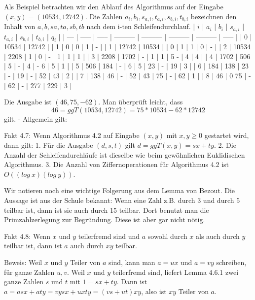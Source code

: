 \documentclass[a4paper]{article}
\begin{document}
\begin{multicols}{3}
    Als Beispiel betrachten wir den Ablauf des Algorithmus auf der Eingabe $(x,y) =(10534,12742)$. Die Zahlen $a_i,b_i,s_{a,i},t_{a,i},s_{b,i},t_{b,i}$ bezeichnen den Inhalt von $a,b,sa,ta,sb,tb$ nach dem i-ten Schleifendurchlauf.
    | $i$ | $a_i$ | $b_i$ | $s_{a,i}$ | $t_{a,i}$ | $s_{b,i}$ | $t_{b,i}$ | $q_i$ |
    | --- | ----- | ----- | --------- | --------- | --------- | --------- | ----- |
    | 0   | 10534 | 12742 |           | 1         | 0         | 0         | 1     | -  |
    | 1   | 12742 | 10534 |           | 0         | 1         | 1         | 0     | -  |
    | 2   | 10534 | 2208  | 1         | 0         | -         | 1         | 1     | 1  |
    | 3   | 2208  | 1702  | -         | 1         | 1         | 5 -       | 4     | 4  |
    | 4   | 1702  | 506   | 5         | -         | 4         | - 6       | 5     | 1  |
    | 5   | 506   | 184   | -         | 6         | 5         | 23        | -     | 19 | 3 |
    | 6   | 184   | 138   | 23        | -         | 19        | -         | 52    | 43 | 2 |
    | 7   | 138   | 46    | -         | 52        | 43        | 75        | -     | 62 | 1 |
    | 8   | 46    | 0 75  | -         | 62        | -         | 277       | 229   | 3  |

    Die Ausgabe ist $(46, 75 ,-62)$. Man überprüft leicht, dass
    $$46 = ggT(10534,12742) = 75* 10534 - 62 * 12742$$
    gilt. - Allgemein gilt:

    Fakt 4.7: Wenn Algorithmus 4.2 auf Eingabe $(x,y)$ mit $x,y\geq 0$ gestartet wird, dann gilt:
    1. Für die Ausgabe $(d,s,t)$ gilt $d= ggT(x,y) =sx+ty$.
    2. Die Anzahl der Schleifendurchläufe ist dieselbe wie beim gewöhnlichen Euklidischen Algorithmus.
    3. Die Anzahl von Ziffernoperationen für Algorithmus 4.2 ist $O((log\ x)(log\ y))$.

    Wir notieren noch eine wichtige Folgerung aus dem Lemma von Bezout. Die Aussage ist aus der Schule bekannt: Wenn eine Zahl z.B. durch $3$ und durch $5$ teilbar ist, dann ist sie auch durch 15 teilbar. Dort benutzt man die Primzahlzerlegung zur Begründung. Diese ist aber gar nicht nötig.

    Fakt 4.8: Wenn $x$ und $y$ teilerfremd sind und $a$ sowohl durch $x$ als auch durch $y$ teilbar ist, dann ist $a$ auch durch $xy$ teilbar.

    Beweis: Weil $x$ und $y$ Teiler von $a$ sind, kann man $a=ux$ und $a=vy$ schreiben, für ganze Zahlen $u,v$. Weil $x$ und $y$ teilerfremd sind, liefert Lemma 4.6.1 zwei ganze Zahlen $s$ und $t$ mit $1=sx+ty$. Dann ist $a=asx+aty=vysx+uxty= (vs+ut)xy$, also ist $xy$ Teiler von $a$.


\end{multicols}
\end{document}
